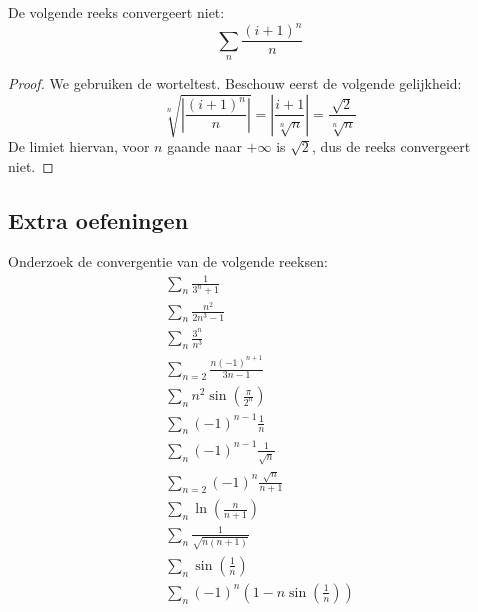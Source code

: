 \documentclass[main.tex]{subfiles}
\begin{document}
\begin{vb}
  De volgende reeks convergeert niet:
  \[ \sum_{n}\frac{(i+1)^{n}}{n} \]

  \begin{proof}
    We gebruiken de worteltest.
    Beschouw eerst de volgende gelijkheid:
    \[ \sqrt[n]{\left| \frac{(i+1)^{n}}{n} \right|} = \left| \frac{i+1}{\sqrt[n]{n}} \right| = \frac{\sqrt{2}}{\sqrt[n]{n}} \]
    De limiet hiervan, voor $n$ gaande naar $+\infty$ is $\sqrt{2}$, dus de reeks convergeert niet.
  \end{proof}
\end{vb}


\subsection{Extra oefeningen}
\label{sec:extra-oefeningen}

Onderzoek de convergentie van de volgende reeksen:
\begin{align}
  \sum_{n}\frac{1}{3^{n}+1}\\
  \sum_{n}\frac{n^{2}}{2n^{3}-1}\\
  \sum_{n}\frac{3^{n}}{n^{3}}\\
  \sum_{n=2}\frac{n(-1)^{n+1}}{3n-1}\\
  \sum_{n} n^{2}\sin\left(\frac{\pi}{2^{n}}\right)\\
  \sum_{n} (-1)^{n-1}\frac{1}{n}\\
  \sum_{n} (-1)^{n-1}\frac{1}{\sqrt{n}}\\
  \sum_{n=2} (-1)^{n}\frac{\sqrt{n}}{n+1}\\
  \sum_{n} \ln\left(\frac{n}{n+1}\right)\\
  \sum_{n} \frac{1}{\sqrt{n(n+1)}}\\
  \sum_{n} \sin\left(\frac{1}{n}\right)\\
  \sum_{n} (-1)^{n} \left( 1 - n\sin\left(\frac{1}{n}\right)\right)
\end{align}
\end{document}
